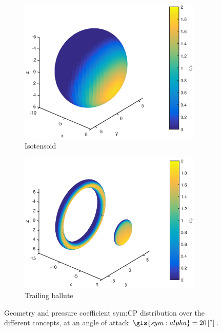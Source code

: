 \begin{figure}[h]
	\begin{subfigure}[b]{0.49\textwidth}
		\includegraphics[width=0.96\textwidth]{./Figure/aero_model/isotensoid.eps}
		\caption{Isotensoid}
		\label{fig:cpisotensoid}
	\end{subfigure}
	\begin{subfigure}[b]{0.49\textwidth}
		\includegraphics[width=0.96\textwidth]{./Figure/aero_model/ballute.eps}
		\caption{Trailing ballute}
		\label{fig:cpballute}
	\end{subfigure}	
	\caption{Geometry and pressure coefficient \gls{sym:CP} distribution over the different concepts, at an angle of attack $\gls{sym:alpha}=20\left[^\circ\right]$. }
	\label{fig:conceptscp}
\end{figure}



